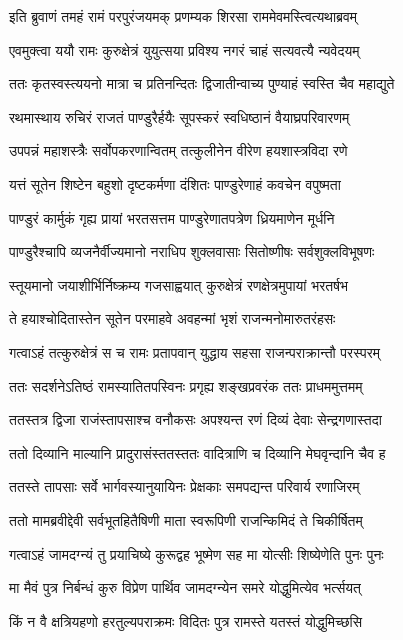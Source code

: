 \twolineshloka
{इति ब्रुवाणं तमहं रामं परपुरंजयमक्}
{प्रणम्यक शिरसा राममेवमस्त्वित्यथाब्रवम्}


\twolineshloka
{एवमुक्त्वा ययौ रामः कुरुक्षेत्रं युयुत्सया}
{प्रविश्य नगरं चाहं सत्यवत्यै न्यवेदयम्}


\twolineshloka
{ततः कृतस्वस्त्ययनो मात्रा च प्रतिनन्दितः}
{द्विजातीन्वाच्य पुण्याहं स्वस्ति चैव महाद्युते}


\twolineshloka
{रथमास्थाय रुचिरं राजतं पाण्डुरैर्हयैः}
{सूपस्करं स्वधिष्ठानं वैयाघ्रपरिवारणम्}


\twolineshloka
{उपपन्नं महाशस्त्रैः सर्वोपकरणान्वितम्}
{तत्कुलीनेन वीरेण हयशास्त्रविदा रणे}


\twolineshloka
{यत्तं सूतेन शिष्टेन बहुशो दृष्टकर्मणा}
{दंशितः पाण्डुरेणाहं कवचेन वपुष्मता}


\twolineshloka
{पाण्डुरं कार्मुकं गृह्य प्रायां भरतसत्तम}
{पाण्डुरेणातपत्रेण ध्रियमाणेन मूर्धनि}


\twolineshloka
{पाण्डुरैश्चापि व्यजनैर्वीज्यमानो नराधिप}
{शुक्लवासाः सितोष्णीषः सर्वशुक्लविभूषणः}


\twolineshloka
{स्तूयमानो जयाशीर्भिर्निष्क्रम्य गजसाह्वयात्}
{कुरुक्षेत्रं रणक्षेत्रमुपायां भरतर्षभ}


\twolineshloka
{ते हयाश्चोदितास्तेन सूतेन परमाहवे}
{अवहन्मां भृशं राजन्मनोमारुतरंहसः}


\twolineshloka
{गत्वाऽहं तत्कुरुक्षेत्रं स च रामः प्रतापवान्}
{युद्धाय सहसा राजन्पराक्रान्तौ परस्परम्}


\twolineshloka
{ततः सदर्शनेऽतिष्ठं रामस्यातितपस्विनः}
{प्रगृह्य शङ्खप्रवरंक ततः प्राधममुत्तमम्}


\twolineshloka
{ततस्तत्र द्विजा राजंस्तापसाश्च वनौकसः}
{अपश्यन्त रणं दिव्यं देवाः सेन्द्रगणास्तदा}


\twolineshloka
{ततो दिव्यानि माल्यानि प्रादुरासंस्ततस्ततः}
{वादित्राणि च दिव्यानि मेघवृन्दानि चैव ह}


\twolineshloka
{ततस्ते तापसाः सर्वे भार्गवस्यानुयायिनः}
{प्रेक्षकाः समपद्यन्त परिवार्य रणाजिरम्}


\twolineshloka
{ततो मामब्रवीद्देवी सर्वभूतहितैषिणी}
{माता स्वरूपिणी राजन्किमिदं ते चिकीर्षितम्}


\twolineshloka
{गत्वाऽहं जामदग्न्यं तु प्रयाचिष्ये कुरूद्वह}
{भूष्मेण सह मा योत्सीः शिष्येणेति पुनः पुनः}


\twolineshloka
{मा मैवं पुत्र निर्बन्धं कुरु विप्रेण पार्थिव}
{जामदग्न्येन समरे योद्धुमित्येव भर्त्सयत्}


\twolineshloka
{किं न वै क्षत्रियहणो हरतुल्यपराक्रमः}
{विदितः पुत्र रामस्ते यतस्तं योद्धुमिच्छसि}


